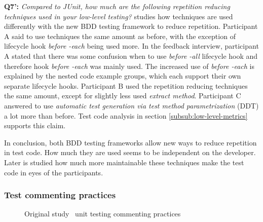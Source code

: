 \textbf{Q7':} \textit{Compared to JUnit, how much are the following repetition reducing techniques used in your low-level testing?}
studies how techniques are used differently with the new BDD testing framework to reduce repetition. Participant A
said to use techniques the same amount as before, with the exception of lifecycle hook \textit{before -each} being used more.
In the feedback interview, participant A stated that there was some confusion when to use \textit{before -all}
lifecycle hook and therefore hook \textit{before -each} was mainly used. The increased use of \textit{before -each} is
explained by the nested code example groups, which each support their own separate lifecycle hooks. Participant B used
the repetition reducing techniques the same amount, except for slightly less used \textit{extract method}. Participant
C answered to use \textit{automatic test generation via test method parametrization} (DDT) a lot more than before. Test
code analysis in section \ref{subsub:low-level-metrics} supports this claim.

In conclusion, both BDD testing frameworks allow new ways to reduce repetition in test code. How much they are used
seems to be independent on the developer. Later is studied how much more maintainable these techniques
make the test code in eyes of the participants.

\subsubsection{Test commenting practices}
    \begin{figure}[ht]%
        \centering
        \qquad
        \caption{Original study~\cite{li2016automatically} unit testing commenting practices}%
        \label{fig:org-commenting}%
    \end{figure}


